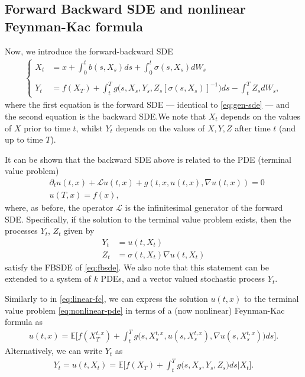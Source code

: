 \documentclass{article}  %
\begin{document}
\subsection{Forward Backward SDE and nonlinear Feynman-Kac formula}
Now, we introduce the forward-backward SDE
%
\begin{align} 
    \label{eq:fbsde}
    \begin{cases}
    X_t &= x + \int_0^t b(s,X_s) ds + \int_0^t \sigma(s,X_s)dW_s\\
    & \\
    Y_t &= f(X_T) + \int_t^T g\big(s,X_s,Y_s,Z_s[\sigma(s,X_s)]^{-1}\big)ds - \int_t^T Z_s dW_s,
    \end{cases}
\end{align}
%
where the first equation is the forward SDE --- identical to \autoref{eq:gen-sde} --- and the second equation is the backward SDE.\@ We note that $X_t$ depends on the values of $X$ prior to time $t$, whilst $Y_t$ depends on the values of $X,Y,Z$ after time $t$ (and up to time $T$). 

It can be shown that the backward SDE above is related to the PDE (terminal value problem)
%
\begin{align}
    \label{eq:nonlinear-pde}
    &\partial_t u(t,x) + \mathcal{L}u(t,x) + g(t,x,u(t,x),\nabla u(t,x)) = 0 \\
    &u(T,x) = f(x), 
\end{align} 
%
where, as before, the operator $\mathcal{L}$ is the infinitesimal generator of the forward SDE. Specifically, if the solution to the terminal value problem exists, then the processes $Y_t$, $Z_t$ given by
%
\begin{align} 
    Y_t &= u(t,X_t)\\
    Z_t &= \sigma(t,X_t) \nabla u(t,X_t)
\end{align}
%
satisfy the FBSDE of \autoref{eq:fbsde}. We also note that this statement can be extended to a system of $k$ PDEs, and a vector valued stochastic process $Y_t$. 

Similarly to in \autoref{eq:linear-fc}, we can express the solution $u(t,x)$ to the terminal value problem \autoref{eq:nonlinear-pde} in terms of a (now nonlinear) Feynman-Kac formula as
%
\begin{align} 
    \label{eq:nonlinear-fc}
    u(t,x) = \mathbb{E}\bigg[ f(X_T^{t,x}) + \int_t^T g\big(s,X_s^{t,x},u(s,X_s^{t,x}),\nabla u(s,X_s^{t,x})\big)ds \bigg].
\end{align} 
%
Alternatively, we can write $Y_t$ as
%
\begin{align} 
    \label{eq:nonlinear-fc-for-y}
    Y_t = u(t,X_t) = \mathbb{E}\bigg[ f(X_T) + \int_t^T g\big(s,X_s,Y_s,Z_s\big)ds \Big\lvert X_t \bigg].
\end{align}
%
\end{document}
